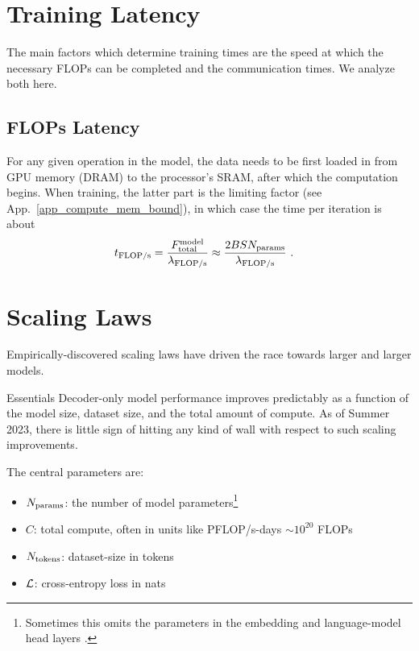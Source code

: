 \documentclass[11pt]{article}
\begin{document}
\section{Training Latency \label{sec_latency_train} }

The main factors which determine training times are the speed at which the necessary FLOPs can be completed
and the communication times. We analyze both here.


\subsection{FLOPs Latency}

For any given operation in the model, the data needs to be first loaded in from GPU memory (DRAM) to
the processor's SRAM, after which the computation begins. When training, the latter part is the limiting
factor (see App.~\ref{app_compute_mem_bound}), in which case the time per iteration is about
\begin{align}
    t _{{\rm FLOP/s}} &=  \frac{ F _{ {\rm total}  } ^{ {\rm  model}  }  }{ \lambda _{ {\rm FLOP/s} } } \approx \frac{ 2 BSN _{ {\rm params} } }{ \lambda _{ {\rm FLOP/s} } }\ .
\end{align}


\section{Scaling Laws}


Empirically-discovered scaling laws have driven the race towards larger and larger models.
\begin{nicebox}{Essentials}
Decoder-only model performance improves predictably as a function of the model size, dataset size,
and the total amount of compute. As of Summer 2023, there is little sign of hitting any kind of wall
with respect to such scaling improvements.
\end{nicebox}


The central parameters are:
\begin{itemize}
    \item $ N _{ {\rm params} } $: the number of model parameters\footnote{Sometimes this omits the
        parameters in the embedding and language-model head layers \cite{kaplan2020scaling}.}
    \item $ C $: total compute, often in units like PFLOP/s-days $ \sim 10 ^{ 20 } $ FLOPs
    \item $ N _{ {\rm tokens} } $: dataset-size in tokens
    \item $\mathcal{L}$: cross-entropy loss in nats
\end{itemize}
\end{document}
